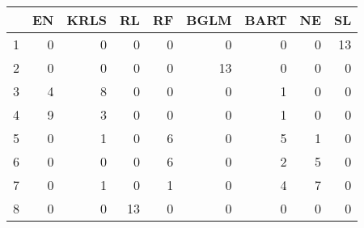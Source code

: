 \begin{table}[ht]
\centering
\begin{tabular}{rrrrrrrrr}
  \hline
 & EN & KRLS & RL & RF & BGLM & BART & NE & SL \\ 
  \hline
1 &   0 &   0 &   0 &   0 &   0 &   0 &   0 &  13 \\ 
  2 &   0 &   0 &   0 &   0 &  13 &   0 &   0 &   0 \\ 
  3 &   4 &   8 &   0 &   0 &   0 &   1 &   0 &   0 \\ 
  4 &   9 &   3 &   0 &   0 &   0 &   1 &   0 &   0 \\ 
  5 &   0 &   1 &   0 &   6 &   0 &   5 &   1 &   0 \\ 
  6 &   0 &   0 &   0 &   6 &   0 &   2 &   5 &   0 \\ 
  7 &   0 &   1 &   0 &   1 &   0 &   4 &   7 &   0 \\ 
  8 &   0 &   0 &  13 &   0 &   0 &   0 &   0 &   0 \\ 
   \hline
\end{tabular}
\end{table}
